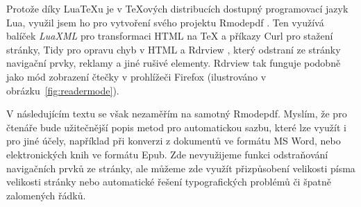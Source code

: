 \documentclass{csbulletin}
\newcommand\balicek[1]{\textit{#1}}
\newcommand\program[1]{#1}
\begin{document}
Protože díky Lua\TeX u je v \TeX ových distribucích dostupný programovací jazyk 
Lua, využil jsem ho pro vytvoření svého projektu \program{Rmodepdf} \cite{rmodepdf}.
Ten využívá balíček \balicek{LuaXML} \cite{luaxml} pro 
transformaci HTML na \TeX{} a příkazy \program{Curl} pro stažení stránky, \program{Tidy} 
pro opravu chyb v HTML a \program{Rdrview} \cite{rdrview}, který odstraní
ze stránky navigační prvky, reklamy a jiné rušivé elementy. \program{Rdrview} 
tak funguje podobně jako mód zobrazení čtečky v prohlížeči \program{Firefox}
(ilustrováno v obrázku~\ref{fig:readermode}).

V následujícím textu se však nezaměřím na samotný \program{Rmodepdf}.
Myslím, že pro čtenáře bude užitečnější popis metod pro automatickou sazbu,
které lze využít i pro jiné účely, například při konverzi z dokumentů ve formátu MS Word, 
nebo elektronických knih ve formátu Epub. Zde nevyužijeme funkci
odstraňování navigačních prvků ze stránky, ale můžeme zde využít
přizpůsobení velikosti písma velikosti stránky nebo automatické řešení
typografických problémů či špatně zalomených řádků.
\end{document}
